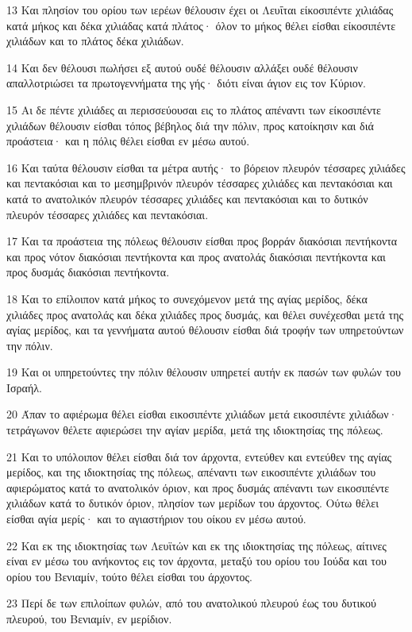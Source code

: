 \par 13 Και πλησίον του ορίου των ιερέων θέλουσιν έχει οι Λευΐται είκοσιπέντε χιλιάδας κατά μήκος και δέκα χιλιάδας κατά πλάτος· όλον το μήκος θέλει είσθαι είκοσιπέντε χιλιάδων και το πλάτος δέκα χιλιάδων.
\par 14 Και δεν θέλουσι πωλήσει εξ αυτού ουδέ θέλουσιν αλλάξει ουδέ θέλουσιν απαλλοτριώσει τα πρωτογεννήματα της γής· διότι είναι άγιον εις τον Κύριον.
\par 15 Αι δε πέντε χιλιάδες αι περισσεύουσαι εις το πλάτος απέναντι των είκοσιπέντε χιλιάδων θέλουσιν είσθαι τόπος βέβηλος διά την πόλιν, προς κατοίκησιν και διά προάστεια· και η πόλις θέλει είσθαι εν μέσω αυτού.
\par 16 Και ταύτα θέλουσιν είσθαι τα μέτρα αυτής· το βόρειον πλευρόν τέσσαρες χιλιάδες και πεντακόσιαι και το μεσημβρινόν πλευρόν τέσσαρες χιλιάδες και πεντακόσιαι και κατά το ανατολικόν πλευρόν τέσσαρες χιλιάδες και πεντακόσιαι και το δυτικόν πλευρόν τέσσαρες χιλιάδες και πεντακόσιαι.
\par 17 Και τα προάστεια της πόλεως θέλουσιν είσθαι προς βορράν διακόσιαι πεντήκοντα και προς νότον διακόσιαι πεντήκοντα και προς ανατολάς διακόσιαι πεντήκοντα και προς δυσμάς διακόσιαι πεντήκοντα.
\par 18 Και το επίλοιπον κατά μήκος το συνεχόμενον μετά της αγίας μερίδος, δέκα χιλιάδες προς ανατολάς και δέκα χιλιάδες προς δυσμάς, και θέλει συνέχεσθαι μετά της αγίας μερίδος, και τα γεννήματα αυτού θέλουσιν είσθαι διά τροφήν των υπηρετούντων την πόλιν.
\par 19 Και οι υπηρετούντες την πόλιν θέλουσιν υπηρετεί αυτήν εκ πασών των φυλών του Ισραήλ.
\par 20 Άπαν το αφιέρωμα θέλει είσθαι εικοσιπέντε χιλιάδων μετά εικοσιπέντε χιλιάδων· τετράγωνον θέλετε αφιερώσει την αγίαν μερίδα, μετά της ιδιοκτησίας της πόλεως.
\par 21 Και το υπόλοιπον θέλει είσθαι διά τον άρχοντα, εντεύθεν και εντεύθεν της αγίας μερίδος, και της ιδιοκτησίας της πόλεως, απέναντι των εικοσιπέντε χιλιάδων του αφιερώματος κατά το ανατολικόν όριον, και προς δυσμάς απέναντι των εικοσιπέντε χιλιάδων κατά το δυτικόν όριον, πλησίον των μερίδων του άρχοντος. Ούτω θέλει είσθαι αγία μερίς· και το αγιαστήριον του οίκου εν μέσω αυτού.
\par 22 Και εκ της ιδιοκτησίας των Λευϊτών και εκ της ιδιοκτησίας της πόλεως, αίτινες είναι εν μέσω του ανήκοντος εις τον άρχοντα, μεταξύ του ορίου του Ιούδα και του ορίου του Βενιαμίν, τούτο θέλει είσθαι του άρχοντος.
\par 23 Περί δε των επιλοίπων φυλών, από του ανατολικού πλευρού έως του δυτικού πλευρού, του Βενιαμίν, εν μερίδιον.
